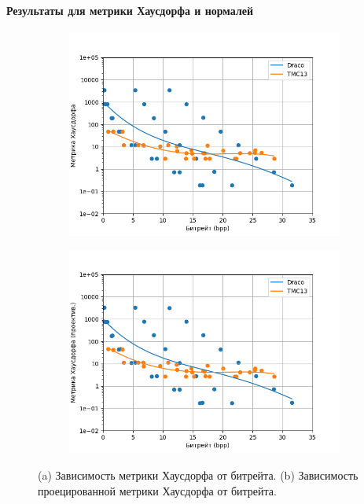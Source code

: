 \documentclass[a4paper,12pt]{extreport}
\begin{document}
\paragraph{Результаты для метрики Хаусдорфа и нормалей}

\begin{figure}[H]
    \centering
    \begin{subfigure}{0.49\textwidth}
        \includegraphics[width=\linewidth]{assets/approx_h_p2pt.png}
        \caption{}
    \end{subfigure}
    \begin{subfigure}{0.49\textwidth}
        \includegraphics[width=\linewidth]{assets/approx_h_p2pl.png}
        \caption{}
    \end{subfigure}
    \caption{ (a) Зависимость метрики Хаусдорфа от битрейта. (b) Зависимость
    проецированной метрики Хаусдорфа от битрейта. }
    \label{img:pcc_arena_hd}
\end{figure}
\end{document}
